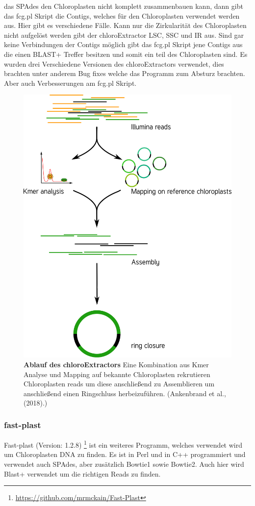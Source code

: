 \documentclass{scrartcl}
\begin{document}
das SPAdes den Chloroplasten nicht komplett zusammenbauen kann, dann gibt das fcg.pl Skript die Contigs, welches für den Chloroplasten verwendet werden aus. Hier gibt es verschiedene Fälle. Kann nur die Zirkularität 
des Chloroplasten nicht aufgelöst werden gibt der chloroExtractor LSC, SSC und IR aus. Sind gar keine Verbindungen der Contigs möglich gibt das fcg.pl Skript jene Contigs aus die einen BLAST+ Treffer besitzen und somit ein
teil des Chloroplasten sind.  Es wurden drei Verschiedene Versionen des chloroExtractors verwendet, dies brachten unter anderem Bug fixes welche das 
Programm zum Absturz brachten. Aber auch Verbesserungen am fcg.pl Skript.

\begin{figure}
\includegraphics[width=.9\linewidth]{./workflow.png}
\caption[Ablauf des chloroExtractors]{\textbf{Ablauf des chloroExtractors} Eine Kombination aus Kmer Analyse und Mapping auf bekannte Chloroplasten rekrutieren Chloroplasten reads um diese anschließend zu Assemblieren um anschließend einen Ringschluss herbeizuführen. (Ankenbrand et al., (2018).)}
\end{figure}

\subsubsection{fast-plast}
\label{sec-2-5-2}
Fast-plast  (Version: 1.2.8) \footnote{\url{https://github.com/mrmckain/Fast-Plast}} ist ein weiteres Programm, welches verwendet wird um Chloroplasten DNA zu finden. Es ist in Perl und in C++ programmiert und verwendet auch SPAdes, 
aber zusätzlich Bowtie1 sowie Bowtie2. Auch hier wird Blast+ verwendet um die richtigen Reads zu finden. 
\end{document}
